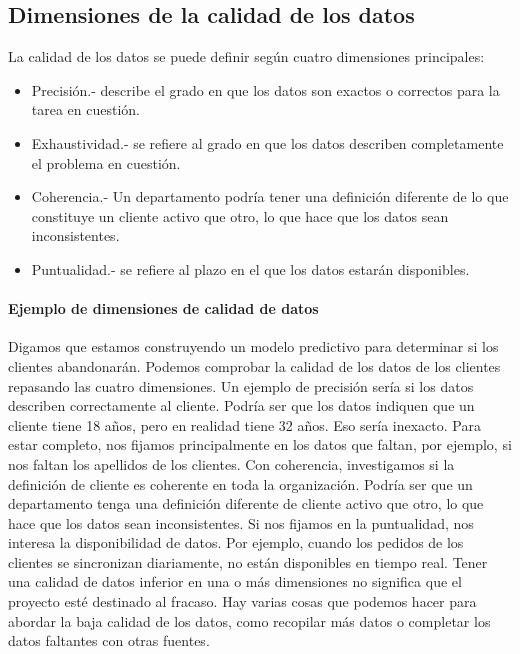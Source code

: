 \documentclass[10pt]{book}
\begin{document}
\subsection{Dimensiones de la calidad de los datos}
La calidad de los datos se puede definir según cuatro dimensiones principales:
\begin{itemize}
	\item Precisión.- describe el grado en que los datos son exactos o correctos para la tarea en cuestión.
	\item Exhaustividad.- se refiere al grado en que los datos describen completamente el problema en cuestión.
	\item Coherencia.- Un departamento podría tener una definición diferente de lo que constituye un cliente activo que otro, lo que hace que los datos sean inconsistentes.
	\item Puntualidad.- se refiere al plazo en el que los datos estarán disponibles.
\end{itemize}

\paragraph{Ejemplo de dimensiones de calidad de datos}
Digamos que estamos construyendo un modelo predictivo para determinar si los clientes abandonarán. Podemos comprobar la calidad de los datos de los clientes repasando las cuatro dimensiones. Un ejemplo de precisión sería si los datos describen correctamente al cliente. Podría ser que los datos indiquen que un cliente tiene 18 años, pero en realidad tiene 32 años. Eso sería inexacto. Para estar completo, nos fijamos principalmente en los datos que faltan, por ejemplo, si nos faltan los apellidos de los clientes. Con coherencia, investigamos si la definición de cliente es coherente en toda la organización. Podría ser que un departamento tenga una definición diferente de cliente activo que otro, lo que hace que los datos sean inconsistentes. Si nos fijamos en la puntualidad, nos interesa la disponibilidad de datos. Por ejemplo, cuando los pedidos de los clientes se sincronizan diariamente, no están disponibles en tiempo real. Tener una calidad de datos inferior en una o más dimensiones no significa que el proyecto esté destinado al fracaso. Hay varias cosas que podemos hacer para abordar la baja calidad de los datos, como recopilar más datos o completar los datos faltantes con otras fuentes.
\end{document}
